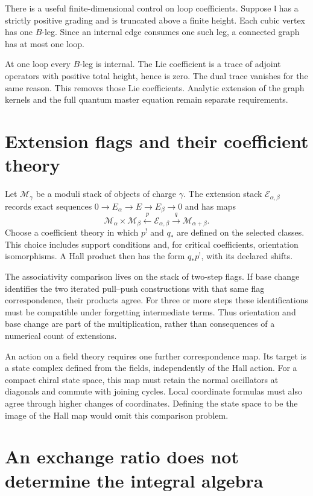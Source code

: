 There is a useful finite-dimensional control on loop coefficients.
Suppose $\mathfrak l$ has a strictly positive grading and is truncated
above a finite height. Each cubic vertex has one $B$-leg. Since an
internal edge consumes one such leg, a connected graph has at most one
loop.

At one loop every $B$-leg is internal. The Lie coefficient is a
trace of adjoint operators with positive total height, hence is zero.
The dual trace vanishes for the same reason. This removes those Lie
coefficients. Analytic extension of the graph kernels and the full
quantum master equation remain separate requirements.

\section{Extension flags and their coefficient theory}

Let $\mathcal M_\gamma$ be a moduli stack of objects of charge
$\gamma$. The extension stack $\mathcal E_{\alpha,\beta}$ records
exact sequences $0\to E_\alpha\to E\to E_\beta\to0$ and has maps
\[
 \mathcal M_\alpha\times\mathcal M_\beta
 \xleftarrow{\ p\ }\mathcal E_{\alpha,\beta}
 \xrightarrow{\ q\ }\mathcal M_{\alpha+\beta}.
\]
Choose a coefficient theory in which $p^!$ and $q_*$ are defined on
the selected classes. This choice includes support conditions and,
for critical coefficients, orientation isomorphisms. A Hall product
then has the form $q_*p^!$, with its declared shifts.

The associativity comparison lives on the stack of two-step flags.
If base change identifies the two iterated pull--push constructions
with that same flag correspondence, their products agree. For three
or more steps these identifications must be compatible under
forgetting intermediate terms. Thus orientation and base change are
part of the multiplication, rather than consequences of a numerical
count of extensions.

An action on a field theory requires one further correspondence map.
Its target is a state complex defined from the fields, independently
of the Hall action. For a compact chiral state space, this map must
retain the normal oscillators at diagonals and commute with joining
cycles. Local coordinate formulas must also agree through higher
changes of coordinates. Defining the state space to be the image of
the Hall map would omit this comparison problem.

\section{An exchange ratio does not determine the integral algebra}

